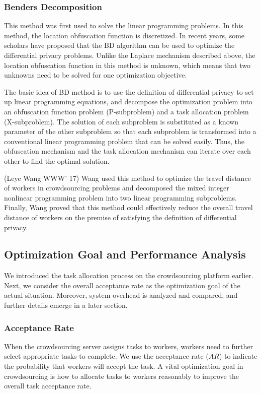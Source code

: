 \subsubsection{Benders Decomposition}
This method was first used to solve the linear programming problems. In this method, the location obfuscation function is discretized. In recent years, some scholars have proposed that the BD algorithm can be used to optimize the differential privacy problems. Unlike the Laplace mechanism described above, the location obfuscation function in this method is unknown, which means that two unknowns need to be solved for one optimization objective.

The basic idea of BD method is to use the definition of differential privacy to set up linear programming equations, and decompose the optimization problem into an obfuscation function problem (P-subproblem) and a task allocation problem (X-subproblem). The solution of each subproblem is substituted as a known parameter of the other subproblem so that each subproblem is transformed into a conventional linear programming problem that can be solved easily. Thus, the obfuscation mechanism and the task allocation mechanism can iterate over each other to find the optimal solution.

(Leye Wang WWW' 17) Wang used this method to optimize the travel distance of workers in crowdsourcing problems and decomposed the mixed integer nonlinear programming problem into two linear programming subproblems. Finally, Wang proved that this method could effectively reduce the overall travel distance of workers on the premise of satisfying the definition of differential privacy.

\subsection{Optimization Goal and Performance Analysis}
We introduced the task allocation process on the crowdsourcing platform earlier. Next, we consider the overall acceptance rate as the optimization goal of the actual situation. Moreover, system overhead is analyzed and compared, and further details emerge in a later section.

\subsubsection{Acceptance Rate}
When the crowdsourcing server assigns tasks to workers, workers need to further select appropriate tasks to complete. We use the acceptance rate ($AR$) to indicate the probability that workers will accept the task. A vital optimization goal in crowdsourcing is how to allocate tasks to workers reasonably to improve the overall task acceptance rate.

